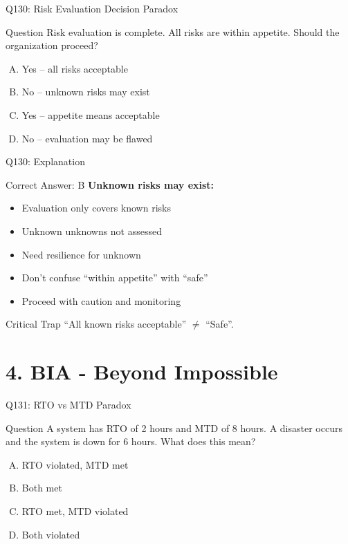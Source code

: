 \documentclass{beamer}
\begin{document}
	\begin{frame}{Q130: Risk Evaluation Decision Paradox}
		\begin{block}{Question}
			Risk evaluation is complete. All risks are within appetite. Should the organization proceed?
		\end{block}
		\begin{enumerate}[(A)]
			\item Yes -- all risks acceptable
			\item No -- unknown risks may exist
			\item Yes -- appetite means acceptable
			\item No -- evaluation may be flawed
		\end{enumerate}
	\end{frame}
	
	\begin{frame}{Q130: Explanation}
		\begin{block}{Correct Answer: B}
			\textbf{Unknown risks may exist:}
			\begin{itemize}
				\item Evaluation only covers known risks
				\item Unknown unknowns not assessed
				\item Need resilience for unknown
				\item Don't confuse ``within appetite'' with ``safe''
				\item Proceed with caution and monitoring
			\end{itemize}
		\end{block}
		\begin{alertblock}{Critical Trap}
			``All known risks acceptable'' $\neq$ ``Safe''.
		\end{alertblock}
	\end{frame}
	
	\section{4. BIA - Beyond Impossible}
	
	\begin{frame}{Q131: RTO vs MTD Paradox}
		\begin{block}{Question}
			A system has RTO of 2 hours and MTD of 8 hours. A disaster occurs and the system is down for 6 hours. What does this mean?
		\end{block}
		\begin{enumerate}[(A)]
			\item RTO violated, MTD met
			\item Both met
			\item RTO met, MTD violated
			\item Both violated
		\end{enumerate}
	\end{frame}
	
\end{document}
